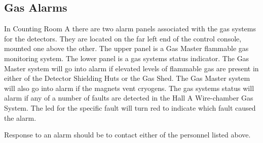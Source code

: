 \subsection{Gas Alarms}

In Counting Room A there are two alarm panels associated with the gas
systems for the detectors.  They are located on the far left end of the
control console, mounted one above the other.  The upper panel is a
Gas Master flammable gas monitoring system.  The lower panel is a gas
systems status indicator.  The Gas Master system will go into alarm if
elevated levels of flammable gas are present in either of the Detector
Shielding Huts or the Gas Shed.  The Gas Master system will also go into
alarm if the magnets vent cryogens.  The gas systems status will
alarm if any of a number of faults are detected in the Hall A Wire-chamber
Gas System.  The led for the specific fault will turn red to indicate which
fault caused the alarm.

Response to an alarm should be to contact either of the personnel listed above.
%
%
%
